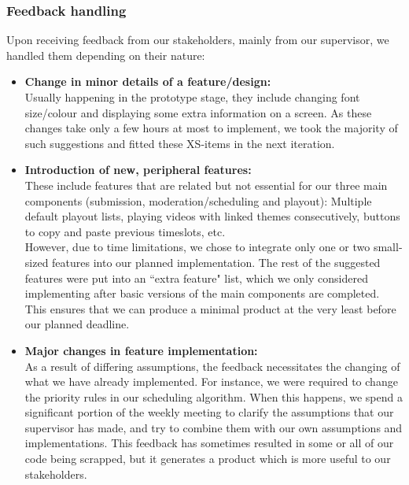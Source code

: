 \documentclass[a4paper, titlepage]{article}
\begin{document}
\subsubsection{Feedback handling}

Upon receiving feedback from our stakeholders, mainly from our supervisor, we handled them depending on their nature:

\begin{itemize}

  \item \textbf{Change in minor details of a feature/design:} \\
        Usually happening in the prototype stage, they include changing font size/colour and displaying some extra information on a screen. As these changes take only a few hours at most to implement, we took the majority of such suggestions and fitted these XS-items in the next iteration.

  \item \textbf{Introduction of new, peripheral features:} \\
        These include features that are related but not essential for our three main components (submission, moderation/scheduling and playout): Multiple default playout lists, playing videos with linked themes consecutively, buttons to copy and paste previous timeslots, etc. \\
        However, due to time limitations, we chose to integrate only one or two small-sized features into our planned implementation. The rest of the suggested features were put into an ``extra feature" list, which we only considered implementing after basic versions of the main components are completed. This ensures that we can produce a minimal product at the very least before our planned deadline.

  \item \textbf{Major changes in feature implementation:} \\
        As a result of differing assumptions, the feedback necessitates the changing of what we have already implemented. For instance, we were required to change the priority rules in our scheduling algorithm. When this happens, we spend a significant portion of the weekly meeting to clarify the assumptions that our supervisor has made, and try to combine them with our own assumptions and implementations. This feedback has sometimes resulted in some or all of our code being scrapped, but it generates a product which is more useful to our stakeholders.

\end{itemize}
\end{document}
